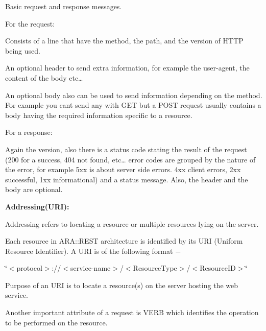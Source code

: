 \begin{DoxyItemize}
\begin{DoxyItemize}
\begin{DoxyItemize}
\begin{DoxyItemize}
\begin{DoxyItemize}
\end{DoxyItemize}
\end{DoxyItemize}
\item Basic request and response messages.
\begin{DoxyItemize}
\item For the request\+:
\begin{DoxyItemize}
\item Consists of a line that have the method, the path, and the version of H\+T\+TP being used.
\item An optional header to send extra information, for example the user-\/agent, the content of the body etc…
\item An optional body also can be used to send information depending on the method. For example you cant send any with G\+ET but a P\+O\+ST request usually contains a body having the required information specific to a resource.
\end{DoxyItemize}
\item For a response\+:
\begin{DoxyItemize}
\item Again the version, also there is a status code stating the result of the request (200 for a success, 404 not found, etc… error codes are grouped by the nature of the error, for example 5xx is about server side errors. 4xx client errors, 2xx successful, 1xx informational) and a status message. Also, the header and the body are optional.
\end{DoxyItemize}
\end{DoxyItemize}
\end{DoxyItemize}
\item {\bfseries Addressing(\+U\+R\+I)\+:}
\begin{DoxyItemize}
\item Addressing refers to locating a resource or multiple resources lying on the server.
\item Each resource in A\+R\+A\+::\+R\+E\+ST architecture is identified by its U\+RI (Uniform Resource Identifier). A U\+RI is of the following format −
\begin{DoxyItemize}
\item \char`\"{}$<$protocol$>$\+://$<$service-\/name$>$/$<$\+Resource\+Type$>$/$<$\+Resource\+I\+D$>$\char`\"{}
\end{DoxyItemize}
\item Purpose of an U\+RI is to locate a resource(s) on the server hosting the web service.
\item Another important attribute of a request is V\+E\+RB which identifies the operation to be performed on the resource.

\end{DoxyItemize}
\end{DoxyItemize}
\end{DoxyItemize}
